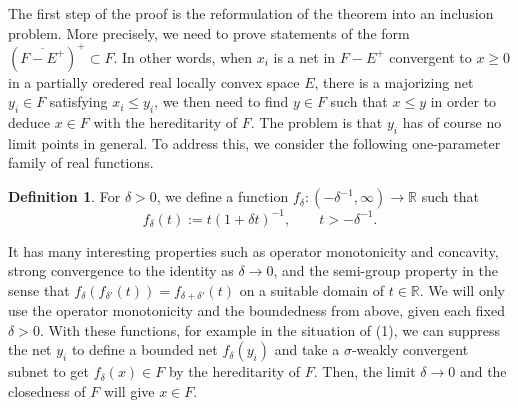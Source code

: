 \documentclass[11pt]{amsart}
\theoremstyle{plain}
\theoremstyle{definition}
\newtheorem{definition}[theorem]{Definition}
\begin{document}
The first step of the proof is the reformulation of the theorem into an inclusion problem.
More precisely, we need to prove statements of the form $(\overline{F-E^+})^+\subset F$.
In other words, when $x_i$ is a net in $F-E^+$ convergent to $x\ge0$ in a partially oredered real locally convex space $E$, there is a majorizing net $y_i\in F$ satisfying $x_i\le y_i$, we then need to find $y\in F$ such that $x\le y$ in order to deduce $x\in F$ with the hereditarity of $F$.
The problem is that $y_i$ has of course no limit points in general.
To address this, we consider the following one-parameter family of real functions.
\begin{definition}
For $\delta>0$, we define a function $f_\delta:(-\delta^{-1},\infty)\to\mathbb{R}$ such that
\[f_\delta(t):=t(1+\delta t)^{-1},\qquad t>-\delta^{-1}.\]
\end{definition}
It has many interesting properties such as operator monotonicity and concavity, strong convergence to the identity as $\delta\to0$, and the semi-group property in the sense that $f_\delta(f_{\delta'}(t))=f_{\delta+\delta'}(t)$ on a suitable domain of $t\in\mathbb{R}$.
We will only use the operator monotonicity and the boundedness from above, given each fixed $\delta>0$.
With these functions, for example in the situation of (1), we can suppress the net $y_i$ to define a bounded net $f_\delta(y_i)$ and take a $\sigma$-weakly convergent subnet to get $f_\delta(x)\in F$ by the hereditarity of $F$.
Then, the limit $\delta\to0$ and the closedness of $F$ will give $x\in F$.
\end{document}
